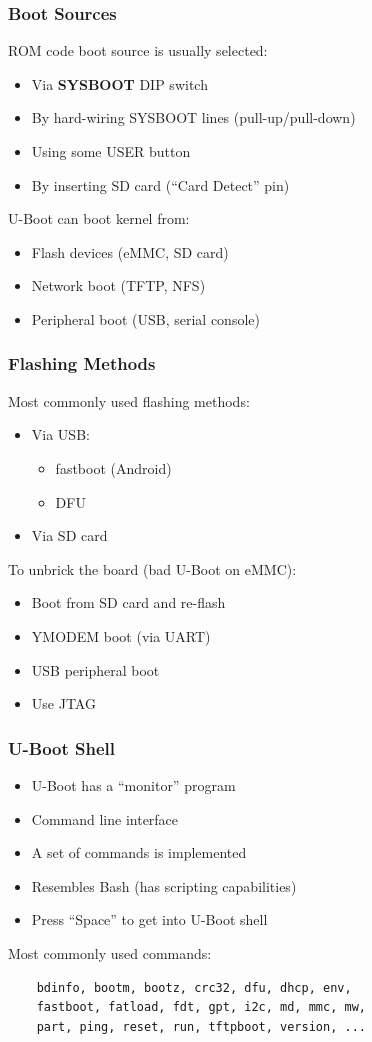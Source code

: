 \begin{frame}
  \frametitle{Boot Sources}
  ROM code boot source is usually selected:
  \begin{itemize}
  \item Via \textbf{SYSBOOT} DIP switch
  \item By hard-wiring SYSBOOT lines (pull-up/pull-down)
  \item Using some USER button
  \item By inserting SD card (``Card Detect'' pin)
  \end{itemize}
  \pause
  U-Boot can boot kernel from:
  \begin{itemize}
  \item Flash devices (eMMC, SD card)
  \item Network boot (TFTP, NFS)
  \item Peripheral boot (USB, serial console)
  \end{itemize}
\end{frame}

\begin{frame}
  \frametitle{Flashing Methods}
  Most commonly used flashing methods:
  \begin{itemize}
  \item Via USB:
    \begin{itemize}
    \item fastboot (Android)
    \item DFU
    \end{itemize}
  \item Via SD card
  \end{itemize}
  \pause
  To unbrick the board (bad U-Boot on eMMC):
  \begin{itemize}
  \item Boot from SD card and re-flash
  \item YMODEM boot (via UART)
  \item USB peripheral boot
  \item Use JTAG
  \end{itemize}
\end{frame}

\begin{frame}[fragile]
  \frametitle{U-Boot Shell}
  \begin{itemize}
  \item U-Boot has a ``monitor'' program
  \item Command line interface
  \item A set of commands is implemented
  \item Resembles Bash (has scripting capabilities)
  \item Press ``Space'' to get into U-Boot shell
  \end{itemize}
  \pause
  Most commonly used commands:
  \begin{verbatim}
    bdinfo, bootm, bootz, crc32, dfu, dhcp, env,
    fastboot, fatload, fdt, gpt, i2c, md, mmc, mw,
    part, ping, reset, run, tftpboot, version, ...
  \end{verbatim}
\end{frame}

